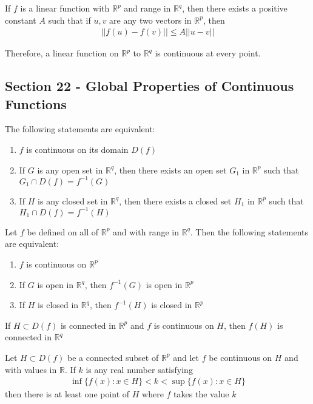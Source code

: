 \documentclass[12pt]{article}
\newcommand{\R}{\mathbb{R}}
\newenvironment{theorem}[2][Theorem]{\begin{trivlist}
\item[\hskip \labelsep {\bfseries #1}\hskip \labelsep {\bfseries #2.}]}{\end{trivlist}}
\newenvironment{corollary}[2][Corollary]{\begin{trivlist}
\item[\hskip \labelsep {\bfseries #1}\hskip \labelsep {\bfseries #2.}]}{\end{trivlist}}
\begin{document}
\begin{theorem}{21.3}
If $f$ is a linear function with $\R^p$ and range in $\R^q$, then there exists a positive constant $A$ such that if $u, v$ are any two vectors in $\R^p$, then
\begin{align*}
||f(u) - f(v)|| \leq A ||u - v||
\end{align*}

Therefore, a linear function on $\R^p$ to $\R^q$ is continuous at every point.
\end{theorem}

\subsection*{Section 22 - Global Properties of Continuous Functions}

\begin{theorem}[Global Continuity]{Theorem}
The following statements are equivalent:
\begin{enumerate}[label=\alph*)]
\item $f$ is continuous on its domain $D(f)$
\item If $G$ is any open set in $\R^q$, then there exists an open set $G_1$ in $\R^p$ such that $G_1 \cap D(f) = f^{-1}(G)$
\item If $H$ is any closed set in $\R^q$, then there exists a closed set $H_1$ in $\R^p$ such that $H_1 \cap D(f) = f^{-1}(H)$
\end{enumerate}
\end{theorem}

\begin{corollary}{22.2}
Let $f$ be defined on all of $\R^p$ and with range in $\R^q$. Then the following statements are equivalent:
\begin{enumerate}[label=\alph*)]
\item $f$ is continuous on $\R^p$
\item If $G$ is open in $\R^q$, then $f^{-1}(G)$ is open in $\R^p$
\item If $H$ is closed in $\R^q$, then $f^{-1}(H)$ is closed in $\R^p$
\end{enumerate}
\end{corollary}

\begin{theorem}[Preservation of]{Connectedness}
If $H \subset D(f)$ is connected in $\R^p$ and $f$ is continuous on $H$, then $f(H)$ is connected in $\R^q$
\end{theorem}

\begin{theorem}[Bolzano's Intermediate Value]{Theorem}
Let $H \subset D(f)$ be a connected subset of $\R^p$ and let $f$ be continuous on $H$ and with values in $\R$. If $k$ is any real number satisfying
\begin{align*}
\inf \{f(x): x \in H\} < k < \sup \{f(x): x \in H\}
\end{align*}
then there is at least one point of $H$ where $f$ takes the value $k$
\end{theorem}
\end{document}
